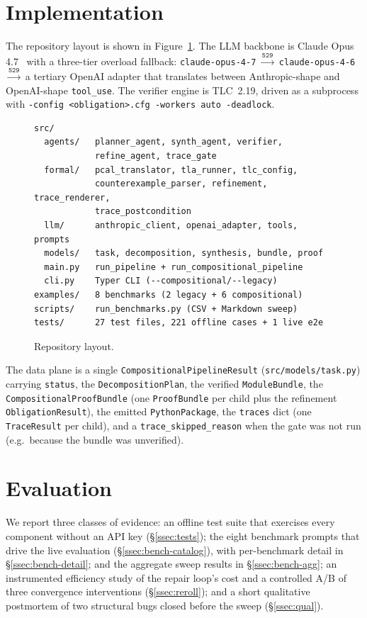 \documentclass[11pt]{article}
\begin{document}
\section{Implementation}\label{sec:impl}

The repository layout is shown in Figure~\ref{fig:layout}. The LLM backbone
is Claude Opus 4.7~\cite{anthropic-claude} with a three-tier overload
fallback: \texttt{claude-opus-4-7} $\xrightarrow{\texttt{529}}$
\texttt{claude-opus-4-6} $\xrightarrow{\texttt{529}}$ a tertiary OpenAI
adapter that translates between Anthropic-shape and OpenAI-shape
\texttt{tool\_use}. The verifier engine is TLC~2.19, driven as a subprocess
with \texttt{-config <obligation>.cfg -workers auto -deadlock}.

\begin{figure}[t]
\begin{lstlisting}
src/
  agents/   planner_agent, synth_agent, verifier,
            refine_agent, trace_gate
  formal/   pcal_translator, tla_runner, tlc_config,
            counterexample_parser, refinement, trace_renderer,
            trace_postcondition
  llm/      anthropic_client, openai_adapter, tools, prompts
  models/   task, decomposition, synthesis, bundle, proof
  main.py   run_pipeline + run_compositional_pipeline
  cli.py    Typer CLI (--compositional/--legacy)
examples/   8 benchmarks (2 legacy + 6 compositional)
scripts/    run_benchmarks.py (CSV + Markdown sweep)
tests/      27 test files, 221 offline cases + 1 live e2e
\end{lstlisting}
\caption{Repository layout.}
\label{fig:layout}
\end{figure}

The data plane is a single \texttt{CompositionalPipelineResult}
(\texttt{src/models/task.py}) carrying \texttt{status}, the
\texttt{DecompositionPlan}, the verified \texttt{ModuleBundle}, the
\texttt{CompositionalProofBundle} (one \texttt{ProofBundle} per child plus
the refinement \texttt{ObligationResult}), the emitted \texttt{PythonPackage},
the \texttt{traces} dict (one \texttt{TraceResult} per child), and a
\texttt{trace\_skipped\_reason} when the gate was not run (e.g.\ because the
bundle was unverified).

\section{Evaluation}\label{sec:eval}

We report three classes of evidence: an offline test suite that
exercises every component without an API key (\S\ref{ssec:tests});
the eight benchmark prompts that drive the live evaluation
(\S\ref{ssec:bench-catalog}), with per-benchmark detail in
\S\ref{ssec:bench-detail}; and the aggregate sweep results in
\S\ref{ssec:bench-agg}; an instrumented efficiency study of the repair
loop's cost and a controlled A/B of three convergence interventions
(\S\ref{ssec:reroll}); and a short qualitative postmortem of two structural
bugs closed before the sweep (\S\ref{ssec:qual}).
\end{document}
